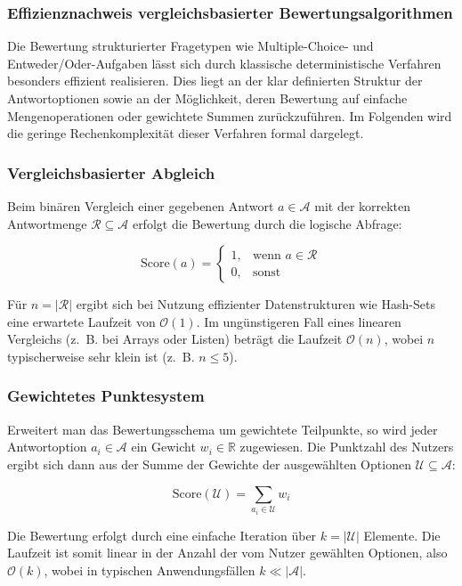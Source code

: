 \documentclass[a4paper,12pt]{article}
\begin{document}
\subsubsection{Effizienznachweis vergleichsbasierter Bewertungsalgorithmen}

Die Bewertung strukturierter Fragetypen wie Multiple-Choice- und Entweder/Oder-Aufgaben lässt sich durch klassische deterministische Verfahren besonders effizient realisieren. Dies liegt an der klar definierten Struktur der Antwortoptionen sowie an der Möglichkeit, deren Bewertung auf einfache Mengenoperationen oder gewichtete Summen zurückzuführen. Im Folgenden wird die geringe Rechenkomplexität dieser Verfahren formal dargelegt.

\subsubsection{Vergleichsbasierter Abgleich}

Beim binären Vergleich einer gegebenen Antwort \( a \in \mathcal{A} \) mit der korrekten Antwortmenge \( \mathcal{R} \subseteq \mathcal{A} \) erfolgt die Bewertung durch die logische Abfrage:

\[
\text{Score}(a) = 
\begin{cases}
1, & \text{wenn } a \in \mathcal{R} \\
0, & \text{sonst}
\end{cases}
\]

Für \( n = |\mathcal{R}| \) ergibt sich bei Nutzung effizienter Datenstrukturen wie Hash-Sets eine erwartete Laufzeit von \( \mathcal{O}(1) \). Im ungünstigeren Fall eines linearen Vergleichs (z.~B. bei Arrays oder Listen) beträgt die Laufzeit \( \mathcal{O}(n) \), wobei \( n \) typischerweise sehr klein ist (z.~B. \( n \leq 5 \)).

\subsubsection{Gewichtetes Punktesystem}

Erweitert man das Bewertungsschema um gewichtete Teilpunkte, so wird jeder Antwortoption \( a_i \in \mathcal{A} \) ein Gewicht \( w_i \in \mathbb{R} \) zugewiesen. Die Punktzahl des Nutzers ergibt sich dann aus der Summe der Gewichte der ausgewählten Optionen \( \mathcal{U} \subseteq \mathcal{A} \):

\[
\text{Score}(\mathcal{U}) = \sum_{a_i \in \mathcal{U}} w_i
\]

Die Bewertung erfolgt durch eine einfache Iteration über \( k = |\mathcal{U}| \) Elemente. Die Laufzeit ist somit linear in der Anzahl der vom Nutzer gewählten Optionen, also \( \mathcal{O}(k) \), wobei in typischen Anwendungsfällen \( k \ll |\mathcal{A}| \).
\end{document}
